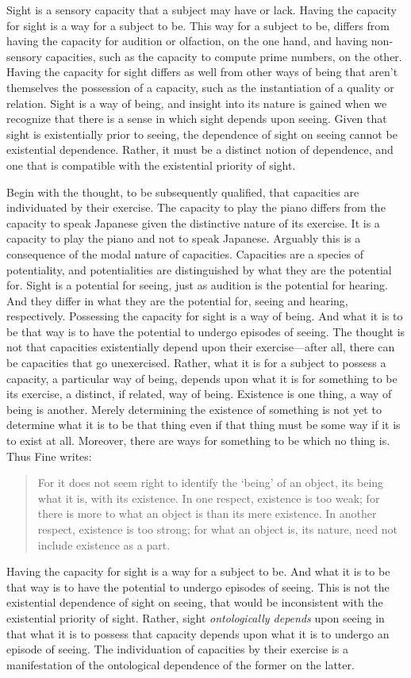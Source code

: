 \documentclass[12pt]{article}
\begin{document}
Sight is a sensory capacity that a subject may have or lack. Having the capacity for sight is a way for a subject to be. This way for a subject to be, differs from having the capacity for audition or olfaction, on the one hand, and having non-sensory capacities, such as the capacity to compute prime numbers, on the other. Having the capacity for sight differs as well from other ways of being that aren't themselves the possession of a capacity, such as the instantiation of a quality or relation. Sight is a way of being, and insight into its nature is gained when we recognize that there is a sense in which sight depends upon seeing. Given that sight is existentially prior to seeing, the dependence of sight on seeing cannot be existential dependence. Rather, it must be a distinct notion of dependence, and one that is compatible with the existential priority of sight.

Begin with the thought, to be subsequently qualified, that capacities are individuated by their exercise. The capacity to play the piano differs from the capacity to speak Japanese given the distinctive nature of its exercise. It is a capacity to play the piano and not to speak Japanese. Arguably this is a consequence of the modal nature of capacities. Capacities are a species of potentiality, and potentialities are distinguished by what they are the potential for. Sight is a potential for seeing, just as audition is the potential for hearing. And they differ in what they are the potential for, seeing and hearing, respectively. Possessing the capacity for sight is a way of being. And what it is to be that way is to have the potential to undergo episodes of seeing. The thought is not that capacities existentially depend upon their exercise---after all, there can be capacities that go unexercised. Rather, what it is for a subject to possess a capacity, a particular way of being, depends upon what it is for something to be its exercise, a distinct, if related, way of being. Existence is one thing, a way of being is another. Merely determining the existence of something is not yet to determine what it is to be that thing even if that thing must be some way if it is to exist at all. Moreover, there are ways for something to be which no thing is. Thus Fine writes:
\begin{quote}
	For it does not seem right to identify the `being' of an object, its being what it is, with its existence. In one respect, existence is too weak; for there is more to what an object is than its mere existence. In another respect, existence is too strong; for what an object is, its nature, need not include existence as a part. \citep[274]{Fine:1995ls}
\end{quote}
Having the capacity for sight is a way for a subject to be. And what it is to be that way is to have the potential to undergo episodes of seeing. This is not the existential dependence of sight on seeing, that would be inconsistent with the existential priority of sight. Rather, sight \emph{ontologically depends} upon seeing in that what it is to possess that capacity depends upon what it is to undergo an episode of seeing. The individuation of capacities by their exercise is a manifestation of the ontological dependence of the former on the latter.
\end{document}
